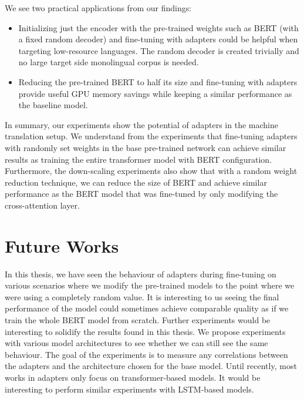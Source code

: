 We see two practical applications from our findings:
\begin{itemize}
    \item Initializing just the encoder with the pre-trained weights such as BERT (with a fixed random decoder) and fine-tuning with adapters could be helpful when targeting low-resource languages. The random decoder is created trivially and no large target side monolingual corpus is needed.
    \item Reducing the pre-trained BERT to half its size and fine-tuning with adapt\-ers provide useful GPU memory savings while keeping a similar performance as the baseline model.
\end{itemize}

In summary, our experiments show the potential of adapters in the machine translation setup. We understand from the experiments that fine-tuning adapters with randomly set weights in the base pre-trained network can achieve similar results as training the entire transformer model with BERT configuration. Furthermore, the down-scaling experiments also show that with a random weight reduction technique, we can reduce the size of BERT and achieve similar performance as the BERT model that was fine-tuned by only modifying the cross-attention layer.

\section{Future Works}
In this thesis, we have seen the behaviour of adapters during fine-tuning on various scenarios where we modify the pre-trained models to the point where we were using a completely random value. It is interesting to us seeing the final performance of the model could sometimes achieve comparable quality as if we train the whole BERT model from scratch. Further experiments would be interesting to solidify the results found in this thesis. We propose experiments with various model architectures to see whether we can still see the same behaviour. The goal of the experiments is to measure any correlations between the adapters and the architecture chosen for the base model. Until recently, most works in adapters only focus on transformer-based models. It would be interesting to perform similar experiments with LSTM-based models.

